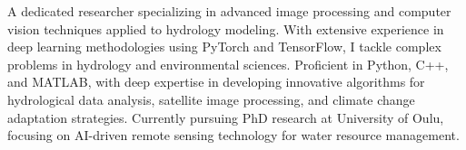 
\begin{cvparagraph}
A dedicated researcher specializing in advanced image processing and computer vision techniques applied to hydrology modeling. With extensive experience in deep learning methodologies using PyTorch and TensorFlow, I tackle complex problems in hydrology and environmental sciences. Proficient in Python, C++, and MATLAB, with deep expertise in developing innovative algorithms for hydrological data analysis, satellite image processing, and climate change adaptation strategies. Currently pursuing PhD research at University of Oulu, focusing on AI-driven remote sensing technology for water resource management.
\end{cvparagraph}